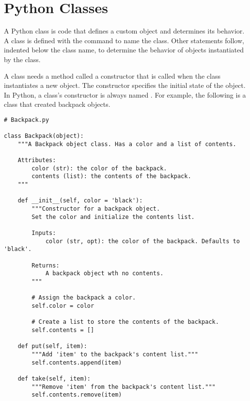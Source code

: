 \label{lab:OOP}

\section*{Python Classes}

A Python class is code that defines a custom object and determines its behavior.
A class is defined with the  command to name the class.
Other statements follow, indented below the class name, to determine the behavior of objects instantiated by the class.

A class needs a method called a constructor that is called when the class instantiates a new object.
The constructor specifies the initial state of the object.
In Python, a class's constructor is always named .
For example, the following is a class that created backpack objects.

\begin{lstlisting}
# Backpack.py

class Backpack(object):
    """A Backpack object class. Has a color and a list of contents.
    
    Attributes:
        color (str): the color of the backpack.
        contents (list): the contents of the backpack.
    """
    
    def __init__(self, color = 'black'):
        """Constructor for a backpack object.
		Set the color and initialize the contents list.
        
        Inputs:
            color (str, opt): the color of the backpack. Defaults to 'black'.
        
        Returns:
            A backpack object wth no contents.
        """
        
        # Assign the backpack a color.
        self.color = color
        
        # Create a list to store the contents of the backpack.
        self.contents = []
    
    def put(self, item):
        """Add 'item' to the backpack's content list."""
        self.contents.append(item)
    
    def take(self, item):
        """Remove 'item' from the backpack's content list."""
        self.contents.remove(item)
\end{lstlisting}

